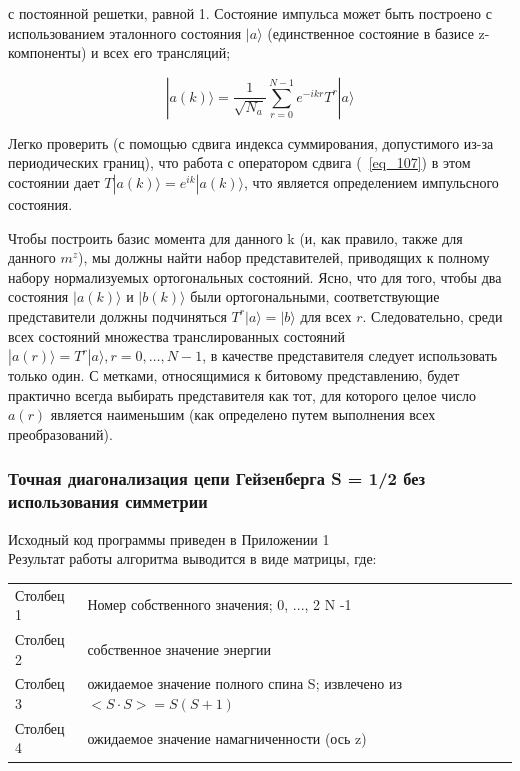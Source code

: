 \documentclass[11pt]{article}
\begin{document}
с постоянной решетки, равной 1. Состояние импульса может быть построено с использованием эталонного состояния $| a \rangle $ (единственное состояние в базисе z-компоненты) и всех его трансляций;

\begin{equation}
|a(k)\rangle=\frac{1}{\sqrt{N_a}}\sum\limits_{r=0}^{N-1}e^{-ikr}T^r|a \rangle
\label{eq_115}
\end{equation}

Легко проверить (с помощью сдвига индекса суммирования, допустимого из-за периодических границ), что работа с оператором сдвига (~\ref{eq_107}) в этом состоянии дает $T | a (k) \rangle = e^{ik} | a (k) \rangle$, что является определением импульсного состояния.

Чтобы построить базис момента для данного k (и, как правило, также для данного $m^z$), мы должны найти набор представителей, приводящих к полному набору нормализуемых ортогональных состояний. Ясно, что для того, чтобы два состояния $| a (k) \rangle$ и $| b (k) \rangle$ были ортогональными, соответствующие представители должны подчиняться $T^r | a\rangle = | b \rangle$ для всех $r$. Следовательно, среди всех состояний множества транслированных состояний $| a(r) \rangle = T^r | a \rangle, r = 0,\dots , N - 1$, в качестве представителя следует использовать только один. С метками, относящимися к битовому представлению, будет практично всегда выбирать представителя как тот, для которого целое число $a(r)$ является наименьшим (как определено путем выполнения всех преобразований).

\subsubsection{Точная диагонализация цепи Гейзенберга S = 1/2 без использования симметрии}

Исходный код программы приведен в Приложении 1\\

Результат работы алгоритма выводится в виде матрицы, где: \\
\begin{tabular}{llll}
Столбец 1 & Номер собственного значения; 0, ..., 2 N -1 \\
Столбец 2 & собственное значение энергии \\
Столбец 3 & ожидаемое значение полного спина S; извлечено из $<S⋅S> = S (S + 1)$ \\
Столбец 4 & ожидаемое значение намагниченности (ось z)\\
\end{tabular} \\
\end{document}

